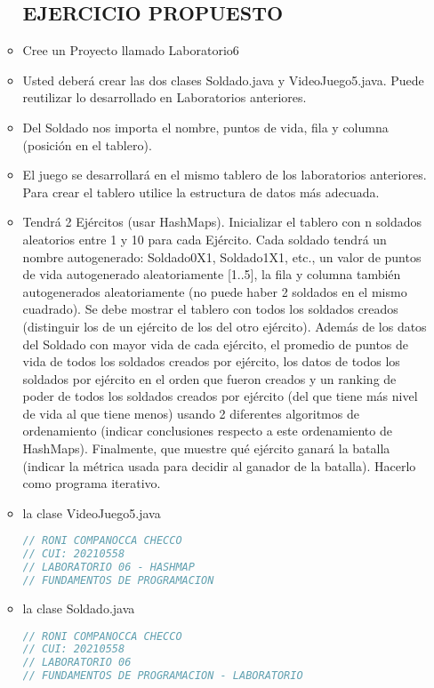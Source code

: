 \documentclass{article}
\begin{document}
\begin{itemize}
\begin{itemize}
        \subsection{EJERCICIO PROPUESTO}
        \item Cree un Proyecto llamado Laboratorio6
        \item Usted deberá crear las dos clases Soldado.java y VideoJuego5.java. Puede reutilizar lo desarrollado en Laboratorios anteriores.
        \item Del Soldado nos importa el nombre, puntos de vida, fila y columna (posición en el tablero).
        \item El juego se desarrollará en el mismo tablero de los laboratorios anteriores. Para crear el tablero utilice la estructura de datos más adecuada.
        \item Tendrá 2 Ejércitos (usar HashMaps). Inicializar el tablero con n soldados aleatorios entre 1 y 10 para cada Ejército. Cada soldado tendrá un nombre autogenerado: Soldado0X1, Soldado1X1, etc., un valor de puntos de vida autogenerado aleatoriamente [1..5], la fila y columna también autogenerados aleatoriamente (no puede haber 2 soldados en el mismo cuadrado). Se debe mostrar el tablero con todos los soldados creados (distinguir los de un ejército de los del otro ejército). Además de los datos del Soldado con mayor vida de cada ejército, el promedio de puntos de vida de todos los soldados creados por ejército, los datos de todos los soldados por ejército en el orden que fueron creados y un ranking de poder de todos los soldados creados por ejército (del que tiene más nivel de vida al que tiene menos) usando 2 diferentes algoritmos de ordenamiento (indicar conclusiones respecto a este ordenamiento de HashMaps). Finalmente, que muestre qué ejército ganará la batalla (indicar la métrica usada para decidir al ganador de la batalla). Hacerlo como programa iterativo.
        
        \item la clase VideoJuego5.java        
        \begin{lstlisting}[language=java]
// RONI COMPANOCCA CHECCO
// CUI: 20210558
// LABORATORIO 06 - HASHMAP
// FUNDAMENTOS DE PROGRAMACION 

        \end{lstlisting}

        \item la clase Soldado.java
        \begin{lstlisting}[language=java]
// RONI COMPANOCCA CHECCO
// CUI: 20210558
// LABORATORIO 06
// FUNDAMENTOS DE PROGRAMACION - LABORATORIO
         \end{lstlisting}


\end{itemize}
\end{itemize}
\end{document}
